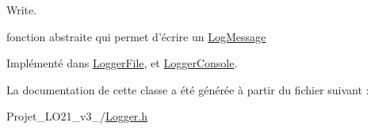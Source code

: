 Write. 

fonction abstraite qui permet d'écrire un \hyperlink{class_log_message}{Log\-Message} 

Implémenté dans \hyperlink{class_logger_file_a010eb0025beb001f6c5b81adad572d21}{Logger\-File}, et \hyperlink{class_logger_console_a9ce9d2e57b1c8a097aebb518d0b40496}{Logger\-Console}.



La documentation de cette classe a été générée à partir du fichier suivant \-:\begin{DoxyCompactItemize}
\item 
Projet\-\_\-\-L\-O21\-\_\-v3\-\_/\hyperlink{_logger_8h}{Logger.\-h}\end{DoxyCompactItemize}
